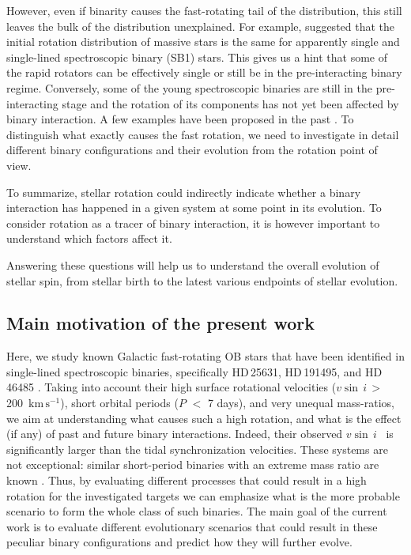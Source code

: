 \documentclass{aa}
\newcommand{\kms}{$\mathrm{km\,s^{-1}}$}
\newcommand{\vsini} {$v\sin\,i$}
\DeclareRobustCommand{\Tabref}[1]{Table~\ref{#1}}
\begin{document}
However, even if binarity causes the fast-rotating tail of the distribution, this still leaves the bulk of the distribution unexplained. For example, \citet{vfts_2015_otype} suggested that
the initial rotation distribution of massive stars is the same for
apparently single and single-lined spectroscopic binary (SB1) stars.
This gives us a hint that some of the rapid rotators can be effectively single or still be in the pre-interacting binary regime.
Conversely, some of the young spectroscopic binaries are still in the pre-interacting stage and the rotation of its components has not yet been affected by binary interaction. A few examples have been proposed in the past \citep{Johnston2021,Stassun_2021, Naze_2023_rot}.
To distinguish what exactly causes the fast rotation, we need to investigate in detail different binary configurations and their evolution from the rotation point of view.


To summarize, stellar rotation could indirectly indicate whether a binary interaction has happened in a given system at some point in its evolution.
To consider rotation as a tracer of binary interaction, it is however important to understand which factors affect it.

Answering these questions will help us to understand the overall evolution of stellar spin, from stellar birth to the latest various endpoints of stellar evolution.

\subsection{Main motivation of the present work}

Here, we study
  known Galactic fast-rotating OB stars that have been identified
  in single-lined spectroscopic binaries, specifically HD\,25631,
  HD\,191495, and HD\,46485
  \citep[SB1,][see also \Tabref{table:sb1_fast}]{Britavskiy_2023,Naze_2023_rot}. Taking into account
  their high surface rotational velocities (\vsini\,$>$\,200~\kms), short orbital periods ($P$ $<$ 7 days), and very unequal
  mass-ratios, we aim at understanding what causes such a high rotation, and what is the effect (if any)
of past and future binary interactions. Indeed, their observed \vsini~ is significantly larger than the tidal synchronization velocities.
These systems are not exceptional: similar short-period
binaries with an extreme mass ratio are known \citep[][]{Moe_2015,Jerzykiewicz_2021}. Thus, by evaluating different processes that
could result in a high rotation for the investigated targets we can
emphasize what is the more probable scenario to form the whole class of such binaries.
The main goal of the current work is to evaluate different evolutionary scenarios that could result in these peculiar binary configurations and predict how they will further evolve.
\end{document}
